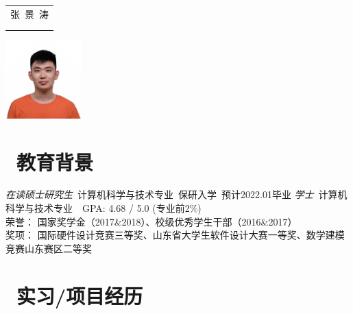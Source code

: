 \documentclass{resume}
\begin{document}
  
   
  \begin{minipage}{0.7\textwidth}
    \Large{
      \begin{tabu}  { l }
        \scshape{张\ 景\ 涛} \\
         \\
         \\
      \end{tabu}
    }
  \end{minipage}
  \begin{minipage}{0.3\textwidth}
    \raggedleft
    \includegraphics[height=30mm]{avatar}
  \end{minipage}
  
  \section{\faGraduationCap\ 教育背景}
  \textit{在读硕士研究生}\ 计算机科学与技术专业\ 保研入学\ 预计2022.01毕业
  \textit{学士}\ 计算机科学与技术专业\ \ GPA: 4.68 / 5.0 (专业前2\%) \\
  荣誉： 国家奖学金（2017\&2018）、校级优秀学生干部（2016\&2017） \\
  奖项： 国际硬件设计竞赛三等奖、山东省大学生软件设计大赛一等奖、数学建模竞赛山东赛区二等奖
  
  \section{\faUsers\ 实习/项目经历}
  
  
\end{document}
